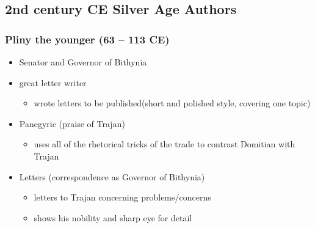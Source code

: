 \documentclass[12pt, twoside]{article}
\begin{document}
\subsection{2nd century CE Silver Age Authors}
\subsubsection{Pliny the younger (63 – 113 CE)}
\begin{itemize}
\item Senator and Governor of Bithynia
\item great letter writer
	\begin{itemize}
	\item wrote letters to be published(short and polished style, covering one topic)
	\end{itemize}
\item Panegyric (praise of Trajan)
	\begin{itemize}
	\item uses all of the rhetorical tricks of the trade to contrast Domitian with Trajan
	\end{itemize}
\item Letters (correspondence as Governor of Bithynia)
	\begin{itemize}
	\item letters to Trajan concerning problems/concerns
	\item shows his nobility and sharp eye for detail
	\end{itemize}
\end{itemize}
\end{document}
